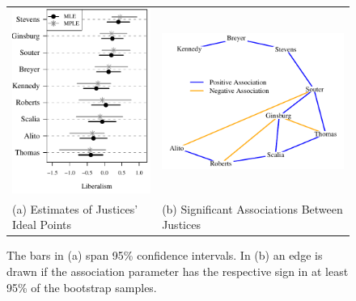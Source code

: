 \begin{figure}[h]
\vspace{-.6cm}
\begin{center}
\begin{tabular}{m{2.5in}m{2.5in}} 
\includegraphics[scale=.65]{fixef} & \includegraphics[scale=.75]{infnet}\\
(a) Estimates of Justices' Ideal Points & (b) Significant Associations Between Justices \\  
\end{tabular}
\end{center}
\vspace{-.3cm}
\caption{The bars in (a) span 95\% confidence intervals. In (b) an edge is drawn if the association parameter has the respective sign in at least  95\% of the bootstrap samples.}
\label{Figure:boltz}
\end{figure}


